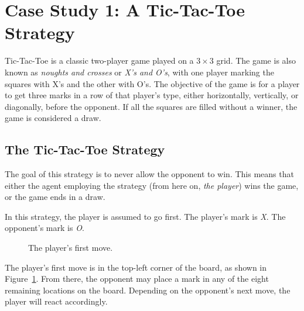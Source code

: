 
\section{Case Study 1: A Tic-Tac-Toe Strategy}\label{sec:tic-tac-toe}

Tic-Tac-Toe is a classic two-player game played on a $3 \times 3$ grid.
The game is also known as \textit{noughts and crosses} or \textit{X's and O's},
with one player marking the squares with X's and the other with O's.
The objective of the game is for a player to get three marks in a row of that
player's type, either horizontally, vertically, or diagonally, before the
opponent.
If all the squares are filled without a winner, the game is considered a draw.

\subsection{The Tic-Tac-Toe Strategy}\label{subsec:the-tic-tac-toe-strategy}

The goal of this strategy is to never allow the opponent to win.
This means that either the agent employing the strategy
(from here on, \textit{the player}) wins the game, or the game ends in a draw.

In this strategy, the player is assumed to go first.
The player's mark is \textit{X}.
The opponent's mark is \textit{O}.

\begin{figure}
    \begin{center}
        \tictactoeboard{+}{ }{ }{ }{ }{ }{ }{ }{ }
    \end{center}
    \caption{The player's first move.}
    \label{fig:ttt-move-1}
\end{figure}

The player's first move is in the top-left corner of the board,
as shown in Figure~\ref{fig:ttt-move-1}.
From there, the opponent may place a mark in any of the eight remaining
locations on the board.
Depending on the opponent's next move, the player will react accordingly.

